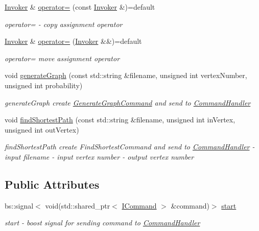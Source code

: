 \begin{DoxyCompactItemize}
\hyperlink{classmin__path_1_1command__handler_1_1_invoker}{Invoker} \& \hyperlink{classmin__path_1_1command__handler_1_1_invoker_ac94844d9754016a60334572f4a288aa7}{operator=} (const \hyperlink{classmin__path_1_1command__handler_1_1_invoker}{Invoker} \&)=default
\begin{DoxyCompactList}\small\item\em operator= -\/ copy assignment operator \end{DoxyCompactList}\item 
\hyperlink{classmin__path_1_1command__handler_1_1_invoker}{Invoker} \& \hyperlink{classmin__path_1_1command__handler_1_1_invoker_ad6797b918ce58ab2c26e686bb15523c8}{operator=} (\hyperlink{classmin__path_1_1command__handler_1_1_invoker}{Invoker} \&\&)=default
\begin{DoxyCompactList}\small\item\em operator= move assignment operator \end{DoxyCompactList}\item 
void \hyperlink{classmin__path_1_1command__handler_1_1_invoker_a163bf285dbd0fc8e66aaba2cd09342ca}{generate\+Graph} (const std\+::string \&filename, unsigned int vertex\+Number, unsigned int probability)
\begin{DoxyCompactList}\small\item\em generate\+Graph create \hyperlink{classmin__path_1_1command__handler_1_1_generate_graph_command}{Generate\+Graph\+Command} and send to \hyperlink{classmin__path_1_1command__handler_1_1_command_handler}{Command\+Handler} \end{DoxyCompactList}\item 
void \hyperlink{classmin__path_1_1command__handler_1_1_invoker_a72677b42fdf6246c51faad0985b3a8b3}{find\+Shortest\+Path} (const std\+::string \&filename, unsigned int in\+Vertex, unsigned int out\+Vertex)
\begin{DoxyCompactList}\small\item\em find\+Shortest\+Path create Find\+Shortest\+Command and send to \hyperlink{classmin__path_1_1command__handler_1_1_command_handler}{Command\+Handler}  -\/ input filename  -\/ input vertex number  -\/ output vertex number \end{DoxyCompactList}\end{DoxyCompactItemize}
\subsection*{Public Attributes}
\begin{DoxyCompactItemize}
\item 
bs\+::signal$<$ void(std\+::shared\+\_\+ptr$<$ \hyperlink{classmin__path_1_1command__handler_1_1_i_command}{I\+Command} $>$ \&command)$>$ \hyperlink{classmin__path_1_1command__handler_1_1_invoker_a9586c0c0672e02050699b4c95fd78169}{start}
\begin{DoxyCompactList}\small\item\em start -\/ boost signal for sending command to \hyperlink{classmin__path_1_1command__handler_1_1_command_handler}{Command\+Handler} \end{DoxyCompactList}\end{DoxyCompactItemize}


